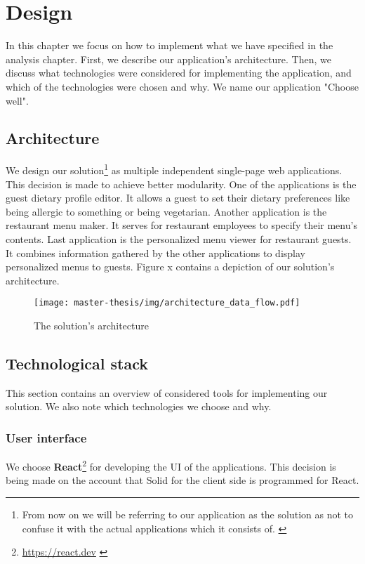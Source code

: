 \chapter{Design}
In this chapter we focus on how to implement what we have specified in the analysis chapter.
First, we describe our application's architecture.
Then, we discuss what technologies were considered for implementing the application, and which of the technologies were chosen and why.
We name our application "Choose well".

\section{Architecture}
We design our solution\footnote{From now on we will be referring to our application as the solution as not to  confuse it with the actual applications which it consists of.  \label{fnlabel}} as multiple independent single-page web applications.
This decision is made to achieve better modularity. 
One of the applications is the guest dietary profile editor.
It allows a guest to set their dietary preferences like being allergic to something or being vegetarian.
Another application is the restaurant menu maker.
It serves for restaurant employees to specify their menu's contents.
Last application is the personalized menu viewer for restaurant guests.
It combines information gathered by the other applications to display personalized menus to guests. 
Figure x contains a depiction of our solution's architecture.

\begin{figure}[h]
  \centering
  \texttt{[image: master-thesis/img/architecture\_data\_flow.pdf]}
  \caption{The solution's architecture}
\end{figure}

\section{Technological stack}
This section contains an overview of considered tools for implementing our solution.
We also note which technologies we choose and why.

\subsection*{User interface}
We choose \textbf{React}\footnote{\url{https://react.dev}  \label{fnlabel}} for developing the UI of the applications.
This decision is being made on the account that Solid for the client side is programmed for React.

